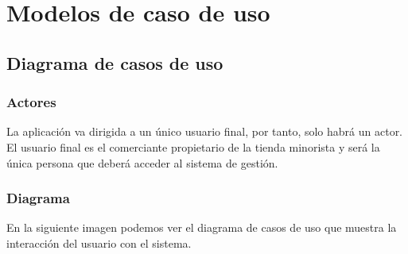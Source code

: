 \newpage

\section{Modelos de caso de uso}

\subsection{Diagrama de casos de uso}

\subsubsection{Actores}

La aplicación va dirigida a un único usuario final, por tanto, solo habrá un actor. El usuario final es el comerciante propietario de la tienda minorista y será la única persona que deberá acceder al sistema de gestión. \\

\subsubsection{Diagrama}

En la siguiente imagen podemos ver el diagrama de casos de uso que muestra la interacción del usuario con el sistema. 

